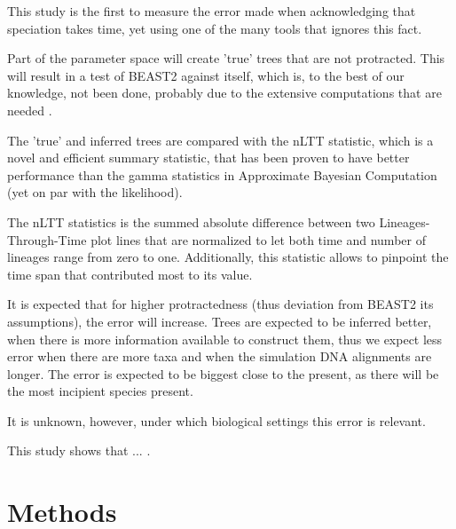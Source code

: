 \documentclass{article}
\begin{document}

This study is the first to measure the error made when acknowledging that
speciation takes time, yet using one of the many tools that ignores this
fact.



Part of the parameter space will create 'true' trees that are not protracted.
This will result in a test of BEAST2 against itself, which is, to the best
of our knowledge, not been done, probably due to the extensive computations
that are needed .


The 'true' and inferred trees are compared with the nLTT statistic, which
is a novel and efficient summary statistic, that has been proven to have
better performance than the gamma statistics in Approximate
Bayesian Computation \cite{janzen2015approximate} (yet on par with the likelihood).

The nLTT statistics is the summed absolute difference between two 
Lineages-Through-Time plot lines that are normalized to 
let both time and number of lineages
range from zero to one.
Additionally, this statistic allows to pinpoint the time span that contributed
most to its value.


It is expected that for higher protractedness (thus deviation from BEAST2
its assumptions), the error will increase.
Trees are expected to be inferred better, when there is more information
available to construct them, thus we expect less error when there are more
taxa and when the simulation DNA alignments are longer.
The error is expected to be biggest close to the present, as there will
be the most incipient species present.
 
It is unknown, however, under which biological settings this error is relevant.


This study shows that ... .

\section{Methods}
\end{document}
